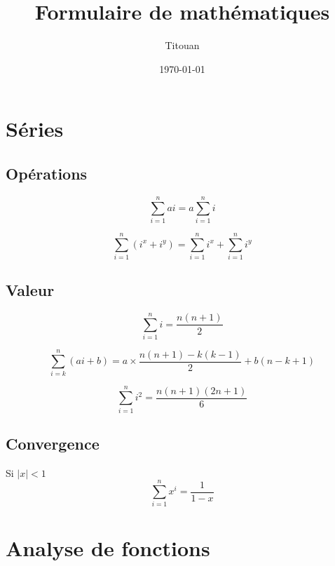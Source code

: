 \documentclass{article}
\title{Formulaire de mathématiques}
\author{Titouan \bsc{Christophe}}
\date{\today}
\begin{document}
\maketitle

\section{Séries}
\subsection{Opérations}
\begin{equation}
    \sum_{i=1}^{n} ai = a\sum_{i=1}^{n} i
\end{equation}

\begin{equation}
    \sum_{i=1}^{n} (i^x + i^y) = \sum_{i=1}^{n} i^x + \sum_{i=1}^{n} i^y
\end{equation}

\subsection{Valeur}
\begin{equation}
    \sum_{i=1}^{n} i = \frac{n(n+1)}{2}
\end{equation}

\begin{equation}
    \sum_{i=k}^{n} (ai + b) = a\times\frac{n(n+1) - k(k-1)}{2} + b(n-k+1)
\end{equation}

\begin{equation}
    \sum_{i=1}^{n} i^2 = \frac{n(n+1)(2n+1)}{6}
\end{equation}

\subsection{Convergence}
Si $|x| < 1$ 
\begin{equation}
    \sum_{i=1}^{n} x^i = \frac{1}{1-x}
\end{equation}

\section{Analyse de fonctions}
\end{document}

